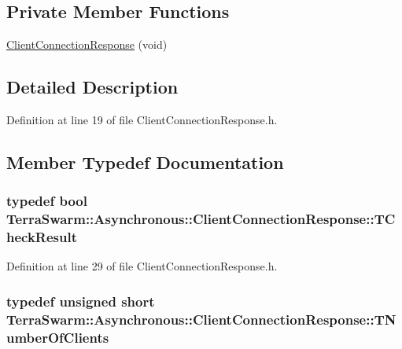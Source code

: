 \subsection*{Private Member Functions}
\begin{DoxyCompactItemize}
\item 
\hyperlink{class_terra_swarm_1_1_asynchronous_1_1_client_connection_response_ae1af37cee2cfdc1c258573a5cc679830}{Client\-Connection\-Response} (void)
\end{DoxyCompactItemize}


\subsection{Detailed Description}


Definition at line 19 of file Client\-Connection\-Response.\-h.



\subsection{Member Typedef Documentation}
\hypertarget{class_terra_swarm_1_1_asynchronous_1_1_client_connection_response_aee00184a039b2aebfcefd9d5b5b71c89}{
\subsubsection[{T\-Check\-Result}]{\setlength{\rightskip}{0pt plus 5cm}typedef bool {\bf Terra\-Swarm\-::\-Asynchronous\-::\-Client\-Connection\-Response\-::\-T\-Check\-Result}}}\label{class_terra_swarm_1_1_asynchronous_1_1_client_connection_response_aee00184a039b2aebfcefd9d5b5b71c89}


Definition at line 29 of file Client\-Connection\-Response.\-h.

\hypertarget{class_terra_swarm_1_1_asynchronous_1_1_client_connection_response_a0780de58d62395a3cce207fe96e43ccc}{
\subsubsection[{T\-Number\-Of\-Clients}]{\setlength{\rightskip}{0pt plus 5cm}typedef unsigned short {\bf Terra\-Swarm\-::\-Asynchronous\-::\-Client\-Connection\-Response\-::\-T\-Number\-Of\-Clients}}}\label{class_terra_swarm_1_1_asynchronous_1_1_client_connection_response_a0780de58d62395a3cce207fe96e43ccc}



